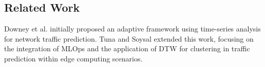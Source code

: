 \subsection{Related Work}
Downey et al. \cite{Downey2023} initially proposed an adaptive framework using time-series analysis for network traffic prediction. Tuna and Soysal \cite{Tuna2023, Soysal2023} extended this work, focusing on the integration of MLOps and the application of DTW for clustering in traffic prediction within edge computing scenarios.

